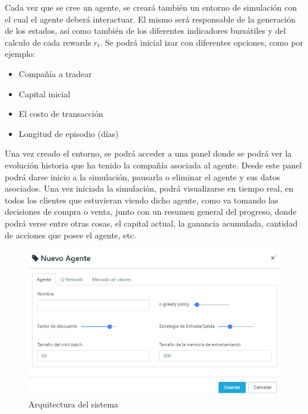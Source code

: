 Cada vez que se cree un agente, se creará también un entorno de simulación con el cual el agente deberá interactuar. El mismo será responsable de la generación de los estados, así como también de los diferentes indicadores bursátiles y del calculo de cada rewards $r_t$. Se podrá inicial izar con diferentes opciones, como por ejemplo:

\begin{itemize}
	\item Compañía a tradear
	\item Capital inicial
	\item El costo de transacción
	\item Longitud de episodio (días)
\end{itemize}


Una vez creado el entorno, se podrá acceder a una panel donde se podrá ver la evolución historia que ha tenido la compañía asociada al agente. Desde este panel podrá darse inicio a la simulación, pausarla o eliminar el agente y sus datos asociados. 
Una vez iniciada la simulación, podrá visualizarse en tiempo real, en todos los clientes que estuvieran viendo dicho agente, como va tomando las decisiones de compra o venta, junto con un resumen general del progreso, donde podrá verse
entre otras cosas, el capital actual, la ganancia acumulada, cantidad de acciones que posee el agente, etc.

\begin{figure}[h!]
	\includegraphics[scale=0.5]{imagenes/screen1.png}
	\caption{Arquitectura del sistema}
\end{figure}


